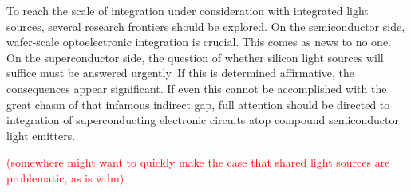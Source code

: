 \documentclass[twocolumn]{article}
\begin{document}
To reach the scale of integration under consideration with integrated light sources, several research frontiers should be explored. On the semiconductor side, wafer-scale optoelectronic integration is crucial. This comes as news to no one. On the superconductor side, the question of whether silicon light sources will suffice must be answered urgently. If this is determined affirmative, the consequences appear significant. If even this cannot be accomplished with the great chasm of that infamous indirect gap, full attention should be directed to integration of superconducting electronic circuits atop compound semiconductor light emitters.

\textcolor{red}{(somewhere might want to quickly make the case that shared light sources are problematic, as is wdm)}

\end{document}
